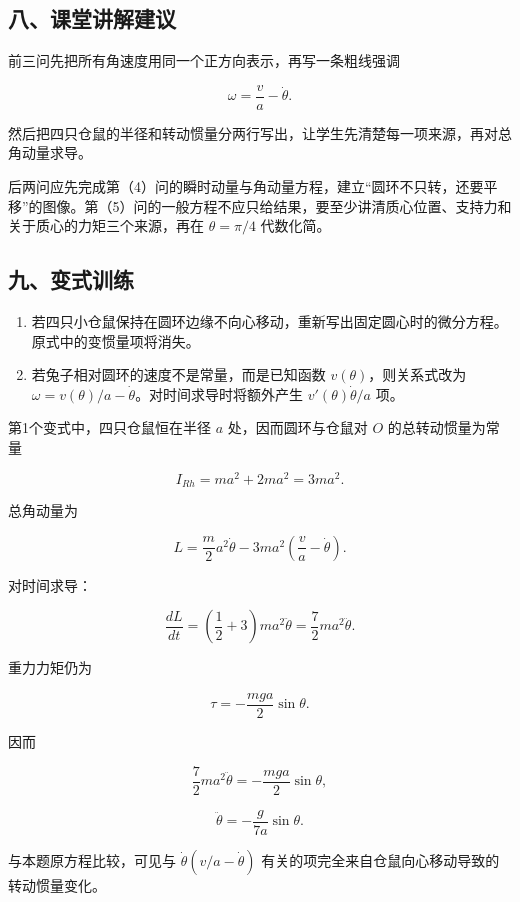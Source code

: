 \documentclass[12pt,a4paper,UTF8]{ctexart}
\newcommand{\tightlist}{\setlength{\itemsep}{0pt}\setlength{\parskip}{0pt}}
\begin{document}
\subsection{八、课堂讲解建议}\label{ux516bux8bfeux5802ux8bb2ux89e3ux5efaux8bae-7}

前三问先把所有角速度用同一个正方向表示，再写一条粗线强调

\[\omega=\frac va-\dot\theta.\]

然后把四只仓鼠的半径和转动惯量分两行写出，让学生先清楚每一项来源，再对总角动量求导。

后两问应先完成第（4）问的瞬时动量与角动量方程，建立``圆环不只转，还要平移''的图像。第（5）问的一般方程不应只给结果，要至少讲清质心位置、支持力和关于质心的力矩三个来源，再在
\(\theta=\pi/4\) 代数化简。

\subsection{九、变式训练}\label{ux4e5dux53d8ux5f0fux8badux7ec3-7}

\begin{enumerate}
\def\labelenumi{\arabic{enumi}.}
\tightlist
\item
  若四只小仓鼠保持在圆环边缘不向心移动，重新写出固定圆心时的微分方程。原式中的变惯量项将消失。
\item
  若兔子相对圆环的速度不是常量，而是已知函数 \(v(\theta)\)，则关系式改为
  \(\omega=v(\theta)/a-\dot\theta\)。对时间求导时将额外产生
  \(v'(\theta)\dot\theta/a\) 项。
\end{enumerate}

第1个变式中，四只仓鼠恒在半径 \(a\) 处，因而圆环与仓鼠对 \(O\)
的总转动惯量为常量

\[I_{Rh}=ma^2+2ma^2=3ma^2.\]

总角动量为

\[L=\frac m2a^2\dot\theta
-3ma^2\left(\frac va-\dot\theta\right).\]

对时间求导：

\[\frac{dL}{dt}
=\left(\frac12+3\right)ma^2\ddot\theta
=\frac72ma^2\ddot\theta.\]

重力力矩仍为

\[\tau=-\frac{mga}{2}\sin\theta.\]

因而

\[\frac72ma^2\ddot\theta
=-\frac{mga}{2}\sin\theta,\]

\[\boxed{\ddot\theta=-\frac g{7a}\sin\theta}.\]

与本题原方程比较，可见与 \(\dot\theta(v/a-\dot\theta)\)
有关的项完全来自仓鼠向心移动导致的转动惯量变化。
\end{document}
